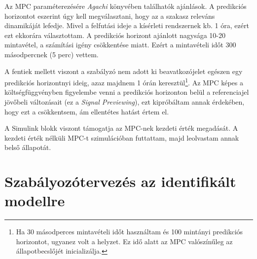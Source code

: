 Az MPC paraméterezésére \textit{Agachi \cite{romanMPC_Agachi}} könyvében találhatók ajánlások. A predikciós horizontot eszerint úgy kell megválasztani, hogy az a szakasz releváns dinamikáját lefedje. Mivel a felfutási ideje a kísérleti rendszernek kb. 1 óra, ezért ezt ekkorára választottam. A predikciós horizont ajánlott nagysága 10-20 mintavétel, a számítási igény csökkentése miatt. Ezért a mintavételi időt 300 másodpercnek (5 perc) vettem.

A fentiek mellett viszont a szabályzó nem adott ki beavatkozójelet egészen egy predikciós horizontnyi ideig, azaz majdnem 1 órán keresztül\footnote{Ha 30 másodperces mintavételi időt használtam és 100 mintányi predikciós horizontot, ugyanez volt a helyzet. Ez idő alatt az MPC valószínűleg az állapotbecslőjét inicializálja.}. Az MPC képes a költségfüggvényben figyelembe venni a predikciós horizonton belül a referenciajel jövőbeli változásait (ez a \textit{Signal Previewing}), ezt kipróbáltam annak érdekében, hogy ezt a  csökkentsem, ám ellentétes hatást értem el.

A Simulink blokk viszont támogatja az MPC-nek kezdeti érték megadását. A kezdeti érték nélküli MPC-t szimulációban futtattam, majd leolvastam annak belső állapotát.



\section{Szabályozótervezés az identifikált modellre}


